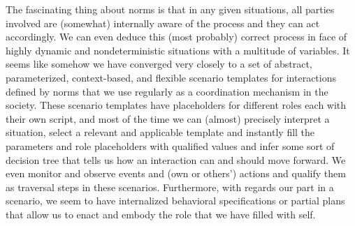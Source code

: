 The fascinating thing about norms is that in any given situations, all parties involved are (somewhat) internally aware of the process and they can act accordingly. We can even deduce this (most probably) correct process in face of highly dynamic and nondeterministic situations with a multitude of variables. It seems like somehow we have converged very closely to a set of abstract, parameterized, context-based, and flexible scenario templates for interactions defined by norms that we use regularly as a coordination mechanism in the society. These scenario templates have placeholders for different roles each with their own script, and most of the time we can (almost) precisely interpret a situation, select a relevant and applicable template and instantly fill the parameters and role placeholders with qualified values and infer some sort of decision tree that tells us how an interaction can and should move forward. We even monitor and observe events and (own or others') actions and qualify them as traversal steps in these scenarios. Furthermore, with regards our part in a scenario, we seem to have internalized behavioral specifications or partial plans that allow us to enact and embody the role that we have filled with self.


